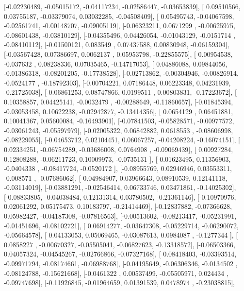 \documentclass{article}
\begin{document}
       [-0.02230489, -0.05015172, -0.04117234, -0.02586447, -0.03653839],
       [ 0.09510566,  0.03755187, -0.03379074,  0.03032285, -0.04508409],
       [ 0.05495743, -0.04067598, -0.02561741, -0.00148707, -0.09005119],
       [-0.06323211,  0.0671299 , -0.00625975, -0.08601438, -0.03810129],
       [-0.04355496,  0.04426054, -0.01043129, -0.0151714 , -0.08410112],
       [-0.01500121,  0.083549  ,  0.07437588,  0.00830948, -0.06159304],
       [-0.03567428,  0.07386697,  0.0062137 ,  0.05953798, -0.22855575],
       [ 0.00954538, -0.037632  ,  0.08238336,  0.07035465, -0.14717053],
       [ 0.04886088,  0.09844056, -0.01386318, -0.08201205, -0.17738528],
       [-0.02713862, -0.00304946, -0.00826914, -0.0524177 , -0.18792303],
       [-0.00704221,  0.07186448,  0.06223348,  0.04231939, -0.21725038],
       [-0.06861253,  0.08747866,  0.0199511 ,  0.00803831, -0.17223672],
       [ 0.10358857,  0.04425141, -0.0032479 , -0.00288649, -0.11860657],
       [-0.01845394, -0.03053458,  0.10622238, -0.02942877, -0.13414356],
       [ 0.0654129 ,  0.06451881,  0.10041367,  0.05600084, -0.16493901],
       [-0.07841503, -0.05828571, -0.00977572, -0.03061243, -0.05597979],
       [-0.02005322,  0.06842882,  0.0618553 , -0.08606998, -0.08229055],
       [-0.04653712,  0.02104451,  0.06067257, -0.04208224, -0.16074151],
       [ 0.02334251, -0.06754289, -0.03686008,  0.0764908 , -0.09069439],
       [ 0.00927284,  0.12808288, -0.06211723,  0.10009973, -0.0735131 ],
       [ 0.01623495,  0.11356903, -0.0404338 , -0.08417724, -0.0520172 ],
       [-0.08955769,  0.02946946,  0.03553311, -0.008571  , -0.07686062],
       [ 0.04984907,  0.03966643,  0.08910539,  0.12141118, -0.03114019],
       [-0.03881291, -0.02546414,  0.06733746,  0.03471861, -0.14025302],
       [-0.08833805, -0.04038484,  0.12131314,  0.03780502, -0.21361146],
       [-0.10970976,  0.02061292,  0.05175473,  0.10183797, -0.21414469],
       [-0.12837882, -0.07366628,  0.05982427, -0.04187308, -0.07816563],
       [-0.00513602, -0.08213417, -0.05231991, -0.01451696, -0.08102721],
       [ 0.06914277, -0.03647308, -0.05229714, -0.06290072, -0.05664578],
       [ 0.04133053,  0.05069465, -0.03087613,  0.0984087 , -0.1277344 ],
       [ 0.0858227 , -0.00670327, -0.05505041, -0.06827623, -0.13318572],
       [-0.06503366,  0.04057324, -0.04545267, -0.02766866, -0.07327168],
       [ 0.08418403, -0.03393514, -0.09971794, -0.08174661, -0.06988768],
       [-0.04195649, -0.06306346, -0.0134502 , -0.08124788, -0.15621668],
       [-0.0461322 ,  0.00537499, -0.05505971,  0.024434  , -0.09747698],
       [-0.11926845, -0.01964659,  0.01391539,  0.0478974 , -0.23038815],
\end{document}
